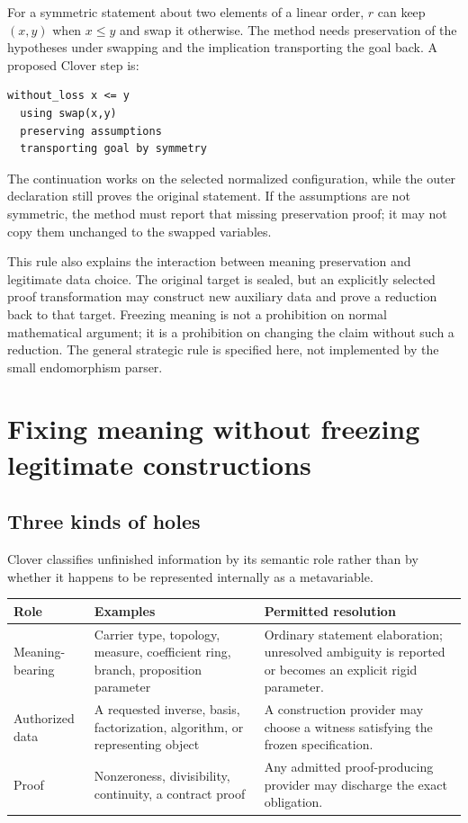 \documentclass[11pt,a4paper]{article}
\theoremstyle{definition}
\theoremstyle{remark}
\begin{document}
For a symmetric statement about two elements of a linear order, $r$ can keep
$(x,y)$ when $x\le y$ and swap it otherwise. The method needs preservation
of the hypotheses under swapping and the implication transporting the goal
back. A proposed Clover step is:
\begin{lstlisting}
without_loss x <= y
  using swap(x,y)
  preserving assumptions
  transporting goal by symmetry
\end{lstlisting}
The continuation works on the selected normalized configuration, while the
outer declaration still proves the original statement. If the assumptions
are not symmetric, the method must report that missing preservation proof;
it may not copy them unchanged to the swapped variables.

This rule also explains the interaction between meaning preservation and
legitimate data choice. The original target is sealed, but an explicitly
selected proof transformation may construct new auxiliary data and prove a
reduction back to that target. Freezing meaning is not a prohibition on normal
mathematical argument; it is a prohibition on changing the claim without such
a reduction. The general strategic rule is specified here, not implemented
by the small endomorphism parser.

\section{Fixing meaning without freezing legitimate constructions}\label{sec:meaning}

\subsection{Three kinds of holes}

Clover classifies unfinished information by its semantic role rather than by
whether it happens to be represented internally as a metavariable.

\begin{center}\small
\begin{tabularx}{\textwidth}{@{}P{.19\textwidth}Y Y@{}}
\toprule
Role & Examples & Permitted resolution\\\midrule
Meaning-bearing & Carrier type, topology, measure, coefficient ring, branch, proposition parameter & Ordinary statement elaboration; unresolved ambiguity is reported or becomes an explicit rigid parameter.\\
Authorized data & A requested inverse, basis, factorization, algorithm, or representing object & A construction provider may choose a witness satisfying the frozen specification.\\
Proof & Nonzeroness, divisibility, continuity, a contract proof & Any admitted proof-producing provider may discharge the exact obligation.\\
\bottomrule
\end{tabularx}
\end{center}
\end{document}
